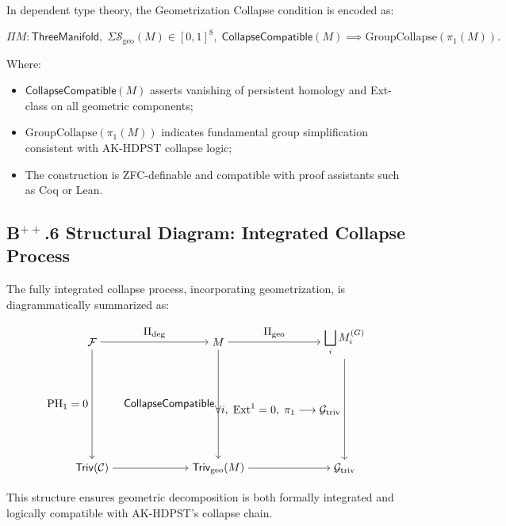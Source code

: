\documentclass[11pt]{article}
\begin{document}
In dependent type theory, the Geometrization Collapse condition is encoded as:

\[
\Pi M : \mathsf{ThreeManifold},\; \Sigma \mathcal{S}_{\mathrm{geo}}(M) \in [0,1]^8,\; \mathsf{CollapseCompatible}(M) \implies \mathrm{GroupCollapse}(\pi_1(M)).
\]

Where:

\begin{itemize}
    \item $\mathsf{CollapseCompatible}(M)$ asserts vanishing of persistent homology and Ext-class on all geometric components;
    \item $\mathrm{GroupCollapse}(\pi_1(M))$ indicates fundamental group simplification consistent with AK-HDPST collapse logic;
    \item The construction is ZFC-definable and compatible with proof assistants such as Coq or Lean.
\end{itemize}

\subsection*{B$^{++}$.6 Structural Diagram: Integrated Collapse Process}

The fully integrated collapse process, incorporating geometrization, is diagrammatically summarized as:

\[
\begin{tikzpicture}[node distance=4cm, auto]
  \node (F) {$\mathcal{F}$};
  \node (M) [right of=F] {$M$};
  \node (Mg) [right of=M] {$\displaystyle \bigsqcup_i M_i^{(G)}$};
  \node (TrivF) [below of=F] {$\mathsf{Triv}(\mathcal{C})$};
  \node (TrivM) [below of=M] {$\mathsf{Triv}_{\mathrm{geo}}(M)$};
  \node (Gtriv) [below of=Mg] {$\mathcal{G}_{\mathrm{triv}}$};

  \draw[->] (F) to node {$\Pi_{\mathrm{deg}}$} (M);
  \draw[->] (M) to node {$\Pi_{\mathrm{geo}}$} (Mg);

  \draw[->] (F) to node[left] {$\mathrm{PH}_1 = 0$} (TrivF);
  \draw[->] (M) to node[left] {$\mathsf{CollapseCompatible}$} (TrivM);
  \draw[->] (Mg) to node[left] {$\forall i,\; \mathrm{Ext}^1 = 0,\; \pi_1 \longrightarrow \mathcal{G}_{\mathrm{triv}}$} (Gtriv);

  \draw[->] (TrivF) to (TrivM);
  \draw[->] (TrivM) to (Gtriv);
\end{tikzpicture}
\]

This structure ensures geometric decomposition is both formally integrated and logically compatible with AK-HDPST's collapse chain.
\end{document}
